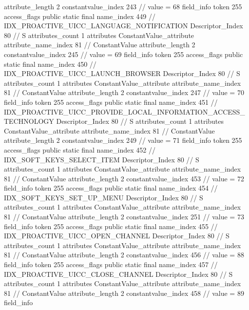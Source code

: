 {{{{{{{					attribute_length	2
					constantvalue_index	243		// value = 68
				}
				}
			}
			field_info {
				token	255
				access_flags	public static final
				name_index	449		// IDX_PROACTIVE_UICC_LANGUAGE_NOTIFICATION
				Descriptor_Index	80		// S
				attributes_count	1
				attributes {
				ConstantValue_attribute {
					attribute_name_index	81		// ConstantValue
					attribute_length	2
					constantvalue_index	245		// value = 69
				}
				}
			}
			field_info {
				token	255
				access_flags	public static final
				name_index	450		// IDX_PROACTIVE_UICC_LAUNCH_BROWSER
				Descriptor_Index	80		// S
				attributes_count	1
				attributes {
				ConstantValue_attribute {
					attribute_name_index	81		// ConstantValue
					attribute_length	2
					constantvalue_index	247		// value = 70
				}
				}
			}
			field_info {
				token	255
				access_flags	public static final
				name_index	451		// IDX_PROACTIVE_UICC_PROVIDE_LOCAL_INFORMATION_ACCESS_TECHNOLOGY
				Descriptor_Index	80		// S
				attributes_count	1
				attributes {
				ConstantValue_attribute {
					attribute_name_index	81		// ConstantValue
					attribute_length	2
					constantvalue_index	249		// value = 71
				}
				}
			}
			field_info {
				token	255
				access_flags	public static final
				name_index	452		// IDX_SOFT_KEYS_SELECT_ITEM
				Descriptor_Index	80		// S
				attributes_count	1
				attributes {
				ConstantValue_attribute {
					attribute_name_index	81		// ConstantValue
					attribute_length	2
					constantvalue_index	453		// value = 72
				}
				}
			}
			field_info {
				token	255
				access_flags	public static final
				name_index	454		// IDX_SOFT_KEYS_SET_UP_MENU
				Descriptor_Index	80		// S
				attributes_count	1
				attributes {
				ConstantValue_attribute {
					attribute_name_index	81		// ConstantValue
					attribute_length	2
					constantvalue_index	251		// value = 73
				}
				}
			}
			field_info {
				token	255
				access_flags	public static final
				name_index	455		// IDX_PROACTIVE_UICC_OPEN_CHANNEL
				Descriptor_Index	80		// S
				attributes_count	1
				attributes {
				ConstantValue_attribute {
					attribute_name_index	81		// ConstantValue
					attribute_length	2
					constantvalue_index	456		// value = 88
				}
				}
			}
			field_info {
				token	255
				access_flags	public static final
				name_index	457		// IDX_PROACTIVE_UICC_CLOSE_CHANNEL
				Descriptor_Index	80		// S
				attributes_count	1
				attributes {
				ConstantValue_attribute {
					attribute_name_index	81		// ConstantValue
					attribute_length	2
					constantvalue_index	458		// value = 89
				}
				}
			}
			field_info {
}}}}}
